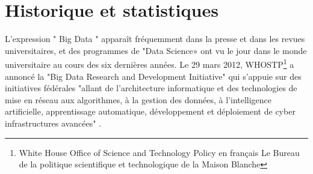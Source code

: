 \newpage

\section{Historique et  statistiques}
\leftskip=1cm

L'expression " Big Data " apparaît fréquemment dans la presse et dans les revues universitaires, et des programmes de "Data Science» ont vu le jour dans le monde universitaire au cours des six dernières années. Le 29 mars 2012, WHOSTP\footnote{White House Office of Science and Technology Policy en français Le Bureau de la politique scientifique et technologique de la Maison Blanche} a annoncé la "Big Data Research and Development Initiative" qui s'appuie sur des initiatives fédérales "allant de l'architecture informatique et des technologies de mise en réseau aux algorithmes, à la gestion des données, à l'intelligence artificielle, apprentissage automatique, développement et déploiement de cyber infrastructures avancées"  \cite{ridgeway2018policing}.\\




